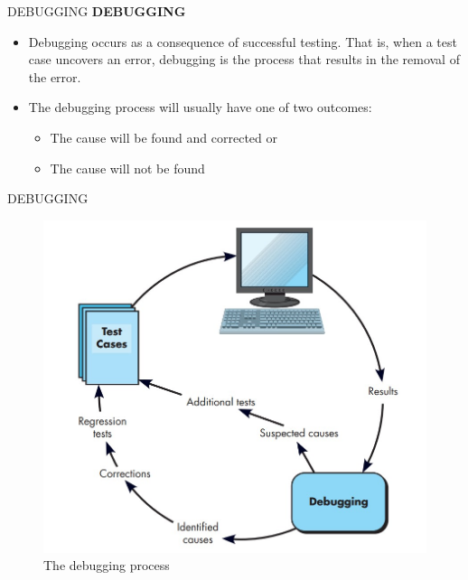 \documentclass{beamer}
\begin{document}
\begin{frame}{DEBUGGING}
	\textbf{DEBUGGING}
	\begin{itemize}
		\item Debugging occurs as a consequence of successful testing. That is, when a test case 
		uncovers an error, debugging is the process that results in the removal of the error.
		\item The debugging process will usually have one of two outcomes:
		\begin{itemize}
			\item The cause will be found and 
			corrected or
			\item The cause will not be found
		\end{itemize}
	\end{itemize}
\end{frame}
\begin{frame}{DEBUGGING}
\begin{figure}
\includegraphics[scale=.4]{img/m3_25}
\caption{The 
	debugging 
	process}
\end{figure}
\end{frame}
\end{document}
